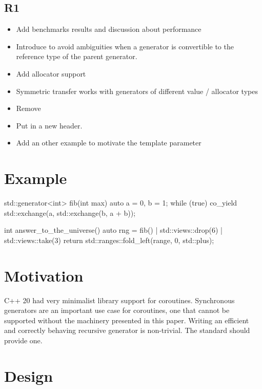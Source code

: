 \documentclass{wg21}
\begin{document}
\subsection{R1}
\begin{itemize}
\item Add benchmarks results and discussion about performance
\item Introduce  to avoid ambiguities when a generator is convertible to the reference type of the parent generator.
\item Add allocator support
\item Symmetric transfer works with generators of different value / allocator types
\item Remove 
\item Put  in a new  header.
\item Add an other example to motivate the  template parameter
\end{itemize}


\section{Example}

\begin{colorblock}
    std::generator<int> fib(int max) {
        auto a = 0, b = 1;
        while (true) {
            co_yield std::exchange(a, std::exchange(b, a + b));
        }
    }

    int answer_to_the_universe() {
        auto rng = fib() | std::views::drop(6) | std::views::take(3)
        return std::ranges::fold_left(range, 0, std::plus{});
    }
\end{colorblock}


\section{Motivation}

C++ 20 had very minimalist library support for coroutines.
Synchronous generators are an important use case for coroutines, one that cannot be supported without
the machinery presented in this paper.
Writing an efficient and correctly behaving recursive generator is non-trivial. The standard should provide one.


\section{Design}
\end{document}
